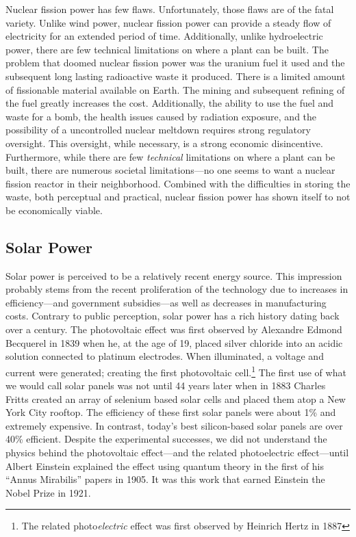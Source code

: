 Nuclear fission power has few flaws. Unfortunately, those flaws are of the fatal variety. Unlike wind power, nuclear fission power can provide a steady flow of electricity for an extended period of time. Additionally, unlike hydroelectric power, there are few technical limitations on where a plant can be built. The problem that doomed nuclear fission power was the uranium fuel it used and the subsequent long lasting radioactive waste it produced. There is a limited amount of fissionable material available on Earth. The mining and subsequent refining of the fuel greatly increases the cost. Additionally, the ability to use the fuel and waste for a bomb, the health issues caused by radiation exposure, and the possibility of a uncontrolled nuclear meltdown requires strong regulatory oversight. This oversight, while necessary, is a strong economic disincentive. Furthermore, while there are few \textit{technical} limitations on where a plant can be built, there are numerous societal limitations---no one seems to want a nuclear fission reactor in their neighborhood. Combined with the difficulties in storing the waste, both perceptual and practical, nuclear fission power has shown itself to not be economically viable.

\subsection{Solar Power}
Solar power is perceived to be a relatively recent energy source. This impression probably stems from the recent proliferation of the technology due to increases in efficiency---and government subsidies---as well as decreases in manufacturing costs. Contrary to public perception, solar power has a rich history dating back over a century. The photovoltaic effect was first observed by Alexandre Edmond Becquerel in 1839 when he, at the age of 19, placed silver chloride into an acidic solution connected to platinum electrodes. When illuminated, a voltage and current were generated; creating the first photovoltaic cell.\footnote{The related photo\textit{electric} effect was first observed by Heinrich Hertz in 1887} The first use of what we would call solar panels was not until 44 years later when in 1883 Charles Fritts created an array of selenium based solar cells and placed them atop a New York City rooftop\cite{historyofenergy}. The efficiency of these first solar panels were about 1\% and extremely expensive. In contrast, today's best silicon-based solar panels are over 40\% efficient. Despite the experimental successes, we did not understand the physics behind the photovoltaic effect---and the related photoelectric effect---until Albert Einstein explained the effect using quantum theory in the first of his ``Annus Mirabilis'' papers in 1905. It was this work that earned Einstein the Nobel Prize in 1921.

